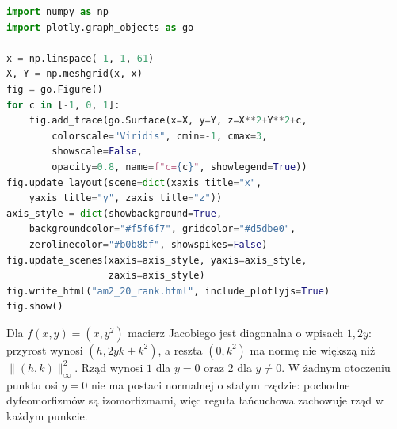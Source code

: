 \begin{lstlisting}[language=Python]
import numpy as np
import plotly.graph_objects as go

x = np.linspace(-1, 1, 61)
X, Y = np.meshgrid(x, x)
fig = go.Figure()
for c in [-1, 0, 1]:
    fig.add_trace(go.Surface(x=X, y=Y, z=X**2+Y**2+c,
        colorscale="Viridis", cmin=-1, cmax=3,
        showscale=False,
        opacity=0.8, name=f"c={c}", showlegend=True))
fig.update_layout(scene=dict(xaxis_title="x",
    yaxis_title="y", zaxis_title="z"))
axis_style = dict(showbackground=True,
    backgroundcolor="#f5f6f7", gridcolor="#d5dbe0",
    zerolinecolor="#b0b8bf", showspikes=False)
fig.update_scenes(xaxis=axis_style, yaxis=axis_style,
                  zaxis=axis_style)
fig.write_html("am2_20_rank.html", include_plotlyjs=True)
fig.show()
\end{lstlisting}

\begin{przyklad}
\label{ma2:ex:rank-jump}
Dla $f(x,y)=(x,y^2)$ macierz Jacobiego jest
diagonalna o wpisach $1,2y$: przyrost wynosi
$(h,2yk+k^2)$, a reszta $(0,k^2)$ ma normę
nie większą niż $\|(h,k)\|_\infty^2$. Rząd wynosi $1$
dla $y=0$ oraz $2$ dla $y\ne0$.
W żadnym otoczeniu punktu osi $y=0$ nie ma
postaci normalnej o stałym rzędzie: pochodne
dyfeomorfizmów są izomorfizmami, więc reguła
łańcuchowa zachowuje rząd w każdym punkcie.
\end{przyklad}
